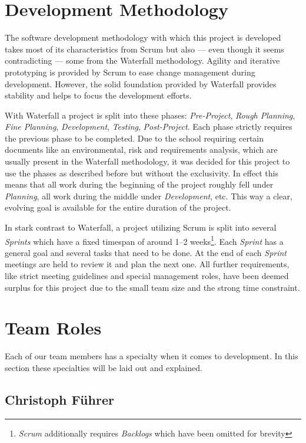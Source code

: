 \section{Development Methodology}

The software development methodology with which this project is developed takes
most of its characteristics from Scrum but also --- even though it seems
contradicting --- some from the Waterfall methodology. Agility and iterative
prototyping is provided by Scrum to ease change management during development.
However, the solid foundation provided by Waterfall provides stability and
helps to focus the development efforts.

With Waterfall a project is split into these phases: \emph{Pre-Project},
\emph{Rough Planning}, \emph{Fine Planning}, \emph{Development},
\emph{Testing}, \emph{Post-Project}. Each phase strictly requires the previous
phase to be completed.
Due to the school requiring certain documents like an environmental, risk and
requirements analysis, which are usually present in the Waterfall methodology,
it was decided for this project to use the phases as described before but
without the exclusivity. In effect this means that all work during the
beginning of the project roughly fell under \emph{Planning}, all work during
the middle under \emph{Development}, etc. This way a clear, evolving goal is
available for the entire duration of the project.

In stark contrast to Waterfall, a project utilizing Scrum is split into several
\emph{Sprints} which have a fixed timespan of around 1--2
weeks\footnote{\emph{Scrum} additionally requires \emph{Backlogs} which have
been omitted for brevity}. Each \emph{Sprint} has a general goal and several
tasks that need to be done. At the end of each \emph{Sprint} meetings are held
to review it and plan the next one.
All further requirements, like strict meeting guidelines and special management
roles, have been deemed surplus for this project due to the small team size and
the strong time constraint.

\section{Team Roles}

Each of our team members has a specialty when it comes to development. In this
section these specialties will be laid out and explained. %

\subsection{Christoph Führer}

